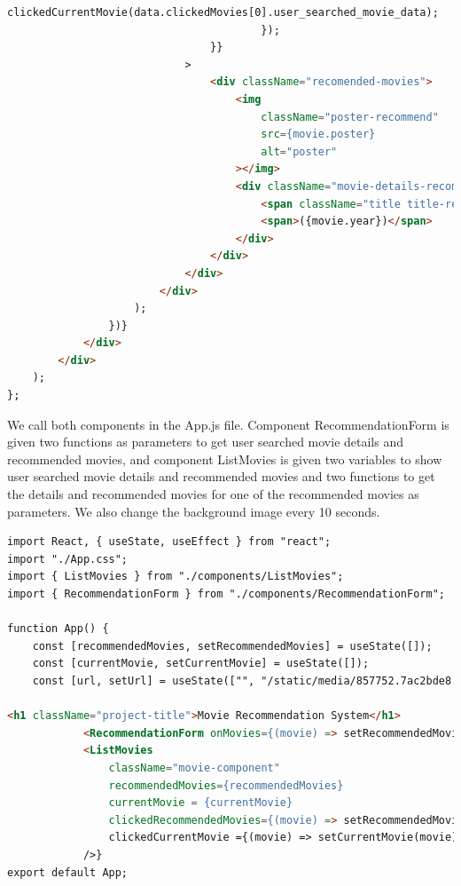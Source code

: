 \begin{lstlisting}[language=HTML]
                                            clickedCurrentMovie(data.clickedMovies[0].user_searched_movie_data);
                                        });
                                }}
                            >
                                <div className="recomended-movies">
                                    <img
                                        className="poster-recommend"
                                        src={movie.poster}
                                        alt="poster"
                                    ></img>
                                    <div className="movie-details-recomended">
                                        <span className="title title-recomended">{movie.title}</span>
                                        <span>({movie.year})</span>
                                    </div>
                                </div>
                            </div>
                        </div>
                    );
                })}
            </div>
        </div>
    );
};
\end{lstlisting}

We call both components in the App.js file. Component RecommendationForm is given two functions as parameters to get user searched movie details and recommended movies, and component ListMovies is given two variables to show user searched movie details and recommended movies and two functions to get the details and recommended movies for one of the recommended movies as parameters. We also change the background image every 10 seconds. 

\begin{lstlisting}[language=HTML]
import React, { useState, useEffect } from "react";
import "./App.css";
import { ListMovies } from "./components/ListMovies";
import { RecommendationForm } from "./components/RecommendationForm";
 
function App() {
    const [recommendedMovies, setRecommendedMovies] = useState([]);
    const [currentMovie, setCurrentMovie] = useState([]);
    const [url, setUrl] = useState(["", "/static/media/857752.7ac2bde8.png"]);
 
<h1 className="project-title">Movie Recommendation System</h1>
            <RecommendationForm onMovies={(movie) => setRecommendedMovies(movie)} onCurrentMovie={(movie) => setCurrentMovie(movie)} />
            <ListMovies
                className="movie-component"
                recommendedMovies={recommendedMovies}
                currentMovie = {currentMovie}
                clickedRecommendedMovies={(movie) => setRecommendedMovies(movie)}
                clickedCurrentMovie ={(movie) => setCurrentMovie(movie)}
            />}
export default App;
\end{lstlisting}

